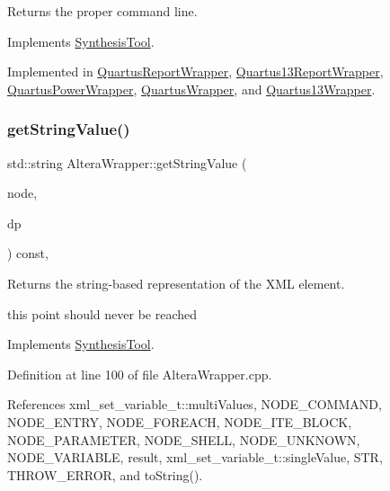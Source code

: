 Returns the proper command line. 



Implements \hyperlink{classSynthesisTool_a8eb2ef7a6230a997a2467d298613c045}{Synthesis\+Tool}.



Implemented in \hyperlink{classQuartusReportWrapper_a1f864436a60dc37ac6cdaa03c720a0a6}{Quartus\+Report\+Wrapper}, \hyperlink{classQuartus13ReportWrapper_a3497e8b5f3941355beb7c64ee771b5ff}{Quartus13\+Report\+Wrapper}, \hyperlink{classQuartusPowerWrapper_aa1ec11014b508f11b22e8882d53d3cb2}{Quartus\+Power\+Wrapper}, \hyperlink{classQuartusWrapper_af543e4704f8dba7bf429b1c9ce58ac58}{Quartus\+Wrapper}, and \hyperlink{classQuartus13Wrapper_aa3d9af79c6ebd372589c482dd6fc3eab}{Quartus13\+Wrapper}.

\mbox{\label{classAlteraWrapper_a3a0bb0f3531b35bf4e9b615042b00e97}} 
\subsubsection{\texorpdfstring{get\+String\+Value()}{getStringValue()}}
{\footnotesize\ttfamily std\+::string Altera\+Wrapper\+::get\+String\+Value (\begin{DoxyParamCaption}\item[{const \hyperlink{xml__script__command_8hpp_a1fe3d50ade66bc35e41be9b68bbbcd02}{xml\+\_\+script\+\_\+node\+\_\+t\+Ref}}]{node,  }\item[{const \hyperlink{DesignParameters_8hpp_ae36bb1c4c9150d0eeecfe1f96f42d157}{Design\+Parameters\+Ref} \&}]{dp }\end{DoxyParamCaption}) const\hspace{0.3cm}{\ttfamily [override]}, {\ttfamily [virtual]}}



Returns the string-\/based representation of the X\+ML element. 

this point should never be reached 

Implements \hyperlink{classSynthesisTool_a730699a51a36280c89b32f324dedc1a7}{Synthesis\+Tool}.



Definition at line 100 of file Altera\+Wrapper.\+cpp.



References xml\+\_\+set\+\_\+variable\+\_\+t\+::multi\+Values, N\+O\+D\+E\+\_\+\+C\+O\+M\+M\+A\+ND, N\+O\+D\+E\+\_\+\+E\+N\+T\+RY, N\+O\+D\+E\+\_\+\+F\+O\+R\+E\+A\+CH, N\+O\+D\+E\+\_\+\+I\+T\+E\+\_\+\+B\+L\+O\+CK, N\+O\+D\+E\+\_\+\+P\+A\+R\+A\+M\+E\+T\+ER, N\+O\+D\+E\+\_\+\+S\+H\+E\+LL, N\+O\+D\+E\+\_\+\+U\+N\+K\+N\+O\+WN, N\+O\+D\+E\+\_\+\+V\+A\+R\+I\+A\+B\+LE, result, xml\+\_\+set\+\_\+variable\+\_\+t\+::single\+Value, S\+TR, T\+H\+R\+O\+W\+\_\+\+E\+R\+R\+OR, and to\+String().



